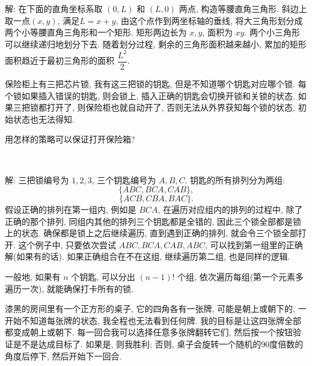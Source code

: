 解: 在下面的直角坐标系取 $(0,L)$ 和 $(L,0)$ 两点, 构造等腰直角三角形. 斜边上取一点$(x,y)$, 满足$L=x+y$, 由这个点作到两坐标轴的垂线, 将大三角形划分成两个小等腰直角三角形和一个矩形. 矩形两边长为 $x,y$, 面积为 $xy$. 两个小三角形可以继续递归地划分下去. 随着划分过程, 剩余的三角形面积越来越小, 累加的矩形面积趋近于最初三角形的面积 $\dfrac{L^2}{2}$.
\begin{figure*}[htbp]
\centering
{}
\end{figure*}


\newpage
保险柜上有三把芯片锁, 我有这三把锁的钥匙, 但是不知道哪个钥匙对应哪个锁. 每个锁如果插入错误的钥匙, 则会锁上, 插入正确的钥匙会切换开锁和关锁的状态. 如果三把锁都打开了, 则保险柜也就自动开了, 否则无法从外界获知每个锁的状态, 初始状态也无法得知.

用怎样的策略可以保证打开保险箱?

~

解: 三把锁编号为 $1,2,3$, 三个钥匙编号为 $A, B, C$. 钥匙的所有排列分为两组: 
$$\{ABC, BCA, CAB\},$$  
$$\{ACB, CBA, BAC\}.$$ 
假设正确的排列在第一组内, 例如是 $BCA$, 在遍历对应组内的排列的过程中, 除了正确的那个排列, 同组内其他的排列三个钥匙都是全错的, 因此三个锁全部都是锁上的状态. 确保都是锁上之后继续遍历, 直到遇到正确的排列, 就会令三个锁全部打开. 这个例子中, 只要依次尝试 $ABC, BCA, CAB, ABC$, 可以找到第一组里的正确解(如果有的话). 如果正确组合在不在这组, 继续遍历第二组, 也是同样的逻辑.

一般地, 如果有 $n$ 个钥匙, 可以分出 $(n-1)!$ 个组, 依次遍历每组(第一个元素多遍历一次), 就能确保打卡所有的锁.


\newpage
漆黑的房间里有一个正方形的桌子, 它的四角各有一张牌, 可能是朝上或朝下的, 一开始不知道每张牌的状态, 我全程也无法看到任何牌. 我的目标是让这四张牌全部都变成朝上或朝下. 每一回合我可以选择任意多张牌翻转它们, 然后按一个按钮验证是不是达成目标了. 如果是, 则我胜利; 否则, 桌子会旋转一个随机的90度倍数的角度后停下, 然后开始下一回合.

